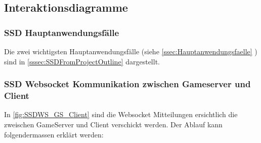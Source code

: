 \documentclass[11pt,ngerman]{article}
\begin{document}
    \subsection{Interaktionsdiagramme}

    \subsubsection{SSD Hauptanwendungsfälle}
    Die zwei wichtigsten Hauptanwendungsfälle (siehe \ref{ssec:Hauptanwendungsfaelle}  ) sind in \ref{sssec:SSDFromProjectOutline}  dargestellt.

    \subsubsection{SSD \Gls{Websocket} Kommunikation zwischen Gameserver und Client}
    In \autoref{fig:SSDWS_GS_Client} sind die \Gls{Websocket} Mitteilungen ersichtlich die zweischen GameServer und Client verschickt werden. Der Ablauf kann folgendermassen erklärt werden:
\end{document}
